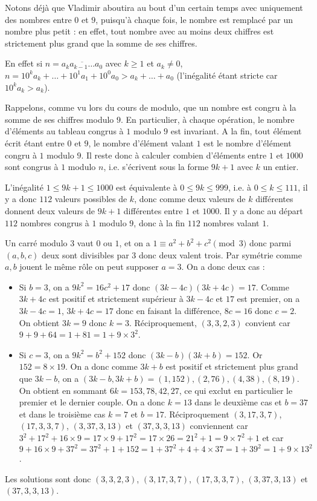 \begin{sol}
Notons déjà que Vladimir aboutira au bout d'un certain temps avec uniquement des nombres entre $0$ et $9$, puisqu'à chaque fois, le nombre est remplacé par un nombre plus petit : en effet, tout nombre avec au moins deux chiffres est strictement plus grand que la somme de ses chiffres.

En effet si $n=\overline{a_ka_{k-1}\dots a_0}$ avec $k\geq 1$ et $a_k\neq 0$, $n=10^ka_k+\dots +10^1a_1+10^0a_0>a_k+\dots +a_0$ (l'inégalité étant stricte car $10^ka_k>a_k$). 

Rappelons, comme vu lors du cours de modulo, que un nombre est congru à la somme de ses chiffres modulo $9$. En particulier, à chaque opération, le nombre d'éléments au tableau congrus à $1$ modulo $9$ est invariant. A la fin, tout élément écrit étant entre $0$ et $9$, le nombre d'élément valant $1$ est le nombre d'élément congru à $1$ modulo $9$. Il reste donc à calculer combien d'éléments entre $1$ et $1000$ sont congrus à $1$ modulo $n$, i.e. s'écrivent sous la forme $9k+1$ avec $k$ un entier.

L'inégalité $1\leq 9k+1\leq 1000$ est équivalente à $0\leq 9k \leq 999$, i.e. à $0\leq k \leq 111$, il y a donc $112$ valeurs possibles de $k$, donc comme deux valeurs de $k$ différentes donnent deux valeurs de $9k+1$ différentes entre $1$ et $1000$. Il y a donc au départ $112$ nombres congrus à $1$ modulo $9$, donc à la fin $112$ nombres valant $1$.
\end{sol}


\begin{sol}
Un carré modulo $3$ vaut $0$ ou $1$, et on a $1\equiv a^2+b^2+c^2\pmod{3}$ donc parmi $(a,b,c)$ deux sont divisibles par $3$ donc deux valent trois. Par symétrie comme $a,b$ jouent le même rôle on peut supposer $a=3$. On a donc deux cas : 
\begin{itemize}
    \item Si $b=3$, on a $9k^2=16c^2+17$ donc $(3k-4c)(3k+4c)=17$. Comme $3k+4c$ est positif et strictement supérieur à $3k-4c$ et $17$ est premier, on a $3k-4c=1$, $3k+4c=17$ donc en faisant la différence, $8c=16$ donc $c=2$. On obtient $3k=9$ donc $k=3$. Réciproquement, $(3,3,2,3)$ convient car $9+9+64=1+81=1+9\times 3^2$.
    \item Si $c=3$, on a $9k^2=b^2+152$ donc $(3k-b)(3k+b)=152$. Or $152=8\times 19$. On a donc comme $3k+b$ est positif et strictement plus grand que $3k-b$, on a $(3k-b,3k+b)=(1,152),(2,76),(4,38),(8,19)$. On obtient en sommant $6k=153,78,42,27$, ce qui exclut en particulier le premier et le dernier couple. On a donc $k=13$ dans le deuxième cas et $b=37$ et dans le troisième cas $k=7$ et $b=17$. Réciproquement $(3,17,3,7)$, $(17,3,3,7)$, $(3,37,3,13)$ et $(37,3, 3,13)$ conviennent car $3^2+17^2+16\times 9=17\times 9 +17^2=17\times 26=21^2+1=9\times 7^2+1$ et car $9+16\times 9 +37^2=37^2+1+152=1+37^2+4+4\times 37=1+39^2=1+9\times 13^2$.
\end{itemize}
Les solutions sont donc $(3, 3, 2, 3)$, $(3, 17, 3, 7)$, $(17, 3, 3, 7)$, $(3, 37, 3, 13)$ et $(37, 3, 3, 13)$.
\end{sol}